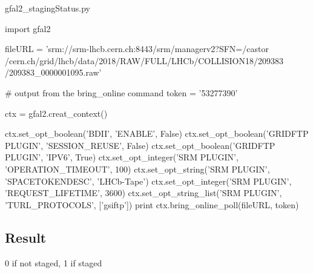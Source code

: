 \documentclass{lhcb+cta}
\begin{document}
\begin{python}
gfal2_stagingStatus.py

import gfal2

fileURL = 'srm://srm-lhcb.cern.ch:8443/srm/managerv2?SFN=/castor
/cern.ch/grid/lhcb/data/2018/RAW/FULL/LHCb/COLLISION18/209383
/209383_0000001095.raw'

# output from the bring_online command
token = '53277390'

ctx = gfal2.creat_context()

ctx.set_opt_boolean('BDII', 'ENABLE', False)
ctx.set_opt_boolean('GRIDFTP PLUGIN', 'SESSION_REUSE', False)
ctx.set_opt_boolean('GRIDFTP PLUGIN', 'IPV6', True)
ctx.set_opt_integer('SRM PLUGIN', 'OPERATION_TIMEOUT', 100)
ctx.set_opt_string('SRM PLUGIN', 'SPACETOKENDESC', 'LHCb-Tape')
ctx.set_opt_integer('SRM PLUGIN', 'REQUEST_LIFETIME', 3600)
ctx.set_opt_string_list('SRM PLUGIN', 'TURL_PROTOCOLS', ['gsiftp'])
print ctx.bring_online_poll(fileURL, token)
\end{python}

\subsection*{Result}

0 if not staged, 1 if staged
\end{document}
